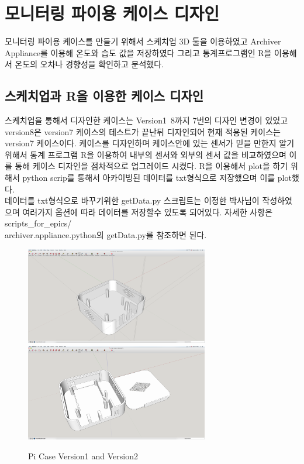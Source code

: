 \documentclass[11pt
  , a4paper
  , article
  , oneside
]{memoir}
\begin{document}
\chapter{모니터링 파이용 케이스 디자인}
모니터링 파이용 케이스를 만들기 위해서 스케치업 3D 툴을 이용하였고 Archiver Appliance를 이용해 온도와 습도 값을 저장하였다 그리고 통계프로그램인 R을 이용해서 온도의 오차나 경향성을 확인하고 분석했다.
\section{스케치업과 R을 이용한 케이스 디자인}
스케치업을 통해서 디자인한 케이스는 Version1~8까지 7번의 디자인 변경이 있었고 version8은 version7 케이스의 테스트가 끝난뒤 디자인되어 현재 적용된 케이스는 version7 케이스이다.
케이스를 디자인하며 케이스안에 있는 센서가 믿을 만한지 알기 위해서 통계 프로그램 R을 이용하여 내부의 센서와 외부의 센서 값을 비교하였으며 이를 통해 케이스 디자인을 점차적으로 업그레이드 시켰다.
R을 이용해서 plot을 하기 위해서 python scrip를 통해서 아카이빙된 데이터를 txt형식으로 저장했으며 이를 plot했다.\\
데이터를 txt형식으로 바꾸기위한 getData.py 스크립트는 이정한 박사님이 작성하였으며 여러가지 옵션에 따라 데이터를 저장할수 있도록 되어있다. 자세한 사항은 scripts\_for\_epics/\\archiver.appliance.python의 getData.py를 참조하면 된다.
\begin{center}
	\begin{figure}[h]
		\includegraphics[width=8cm]{./images/V1.png}
		\includegraphics[width=8cm]{./images/V2.png}
		\caption{Pi Case Version1 and Version2}
	\end{figure}
\end{center}
\end{document}
